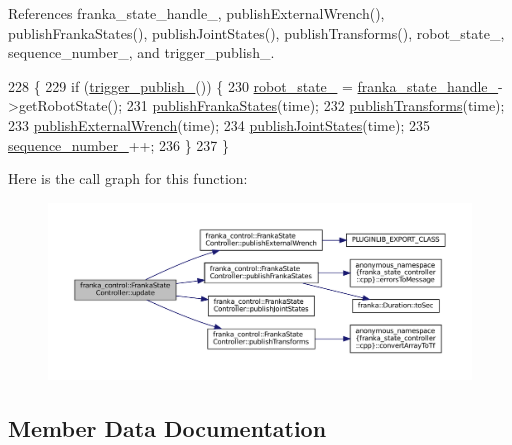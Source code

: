 References franka\+\_\+state\+\_\+handle\+\_\+, publish\+External\+Wrench(), publish\+Franka\+States(), publish\+Joint\+States(), publish\+Transforms(), robot\+\_\+state\+\_\+, sequence\+\_\+number\+\_\+, and trigger\+\_\+publish\+\_\+.


\begin{DoxyCode}
228                                                                             \{
229   \textcolor{keywordflow}{if} (\hyperlink{classfranka__control_1_1FrankaStateController_a1c903d6812d02a29796d64b0fc3eb51d}{trigger\_publish\_}()) \{
230     \hyperlink{classfranka__control_1_1FrankaStateController_a0d097abb2665aadbc8d38662bba5ae8b}{robot\_state\_} = \hyperlink{classfranka__control_1_1FrankaStateController_a7f665b5f5fda44bcfa5f0703806d0048}{franka\_state\_handle\_}->getRobotState();
231     \hyperlink{classfranka__control_1_1FrankaStateController_a70977857f43faff9127db1ebfeddc1b5}{publishFrankaStates}(time);
232     \hyperlink{classfranka__control_1_1FrankaStateController_abcab70ff196a1751f625bc14a789ca82}{publishTransforms}(time);
233     \hyperlink{classfranka__control_1_1FrankaStateController_a16421a8f95eb59bb9e94e4f011e33cb2}{publishExternalWrench}(time);
234     \hyperlink{classfranka__control_1_1FrankaStateController_a37c67130a3359cb9cffa6af4a207615e}{publishJointStates}(time);
235     \hyperlink{classfranka__control_1_1FrankaStateController_ae36c62620e0099ce91976548bf51f240}{sequence\_number\_}++;
236   \}
237 \}
\end{DoxyCode}
Here is the call graph for this function\+:
\nopagebreak
\begin{figure}[H]
\begin{center}
\leavevmode
\includegraphics[width=350pt]{classfranka__control_1_1FrankaStateController_ad7a282e355860395576ff4d116bbbb7b_cgraph}
\end{center}
\end{figure}


\subsection{Member Data Documentation}
\mbox{\label{classfranka__control_1_1FrankaStateController_a603d865facc13c7b1f2ebb5a27404221}} 
